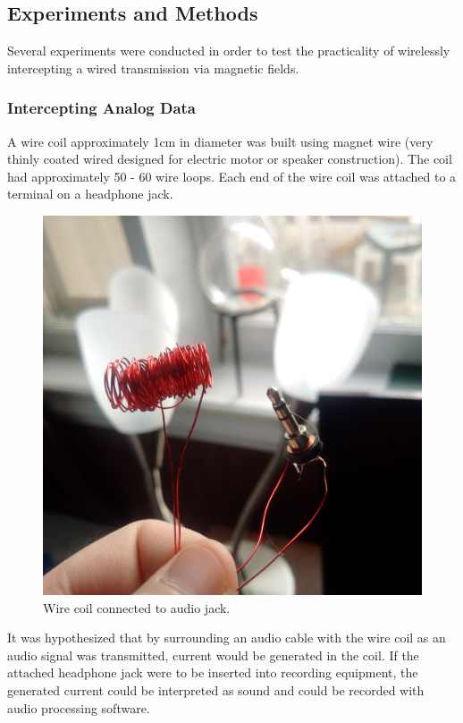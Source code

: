 \documentclass{article}
\begin{document}
\subsection{Experiments and Methods}
Several experiments were conducted in order to test the practicality of wirelessly intercepting a wired transmission via magnetic fields.

\subsubsection{Intercepting Analog Data}
A wire coil approximately 1cm in diameter was built using magnet wire (very thinly coated wired designed for electric motor or speaker construction). The coil had approximately 50 - 60 wire loops. Each end of the wire coil was attached to a terminal on a headphone jack.

\begin{figure}
	\includegraphics[width=\linewidth]{images/coil_jack.jpg}
	\caption{Wire coil connected to audio jack.}
	\label{fig:coil_jack}
\end{figure}

It was hypothesized that by surrounding an audio cable with the wire coil as an audio signal was transmitted, current would be generated in the coil. If the attached headphone jack were to be inserted into recording equipment, the generated current could be interpreted as sound and could be recorded with audio processing software.
\end{document}
